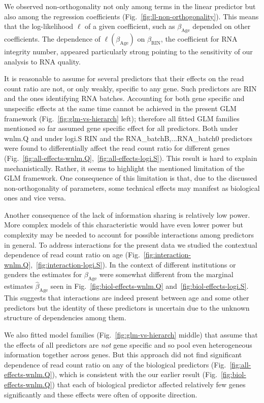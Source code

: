 \documentclass[letterpaper]{article}
\begin{document}
We observed non-orthogonality not only among terms in the linear predictor but
also among the regression coefficients (Fig.~\ref{fig:ll-non-orthogonality}).
This means that the log-likelihood \(\ell\) of a given coefficient, such as
\(\beta_\mathrm{Age}\) depended on other coefficients.  The dependence of
\(\ell(\beta_\mathrm{Age})\) on \(\beta_\mathrm{RIN}\), the coefficient for
RNA integrity number, appeared particularly strong pointing to the sensitivity
of our analysis to RNA quality.

It is reasonable to assume for several predictors that their effects on the
read count ratio are not, or only weakly, specific to any gene.  Such predictors are RIN
and the ones identifying RNA batches.  Accounting for both gene specific and
unspecific effects at the same time cannot be achieved in the present GLM
framework (Fig.~\ref{fig:glm-vs-hierarch} left); therefore all fitted GLM
families mentioned so far assumed gene specific effect for all predictors.
Both under wnlm.Q and under logi.S RIN and the RNA\_batchB,...RNA\_batch0
predictors were found to differentially affect the read count ratio for
different genes
(Fig.~\ref{fig:all-effects-wnlm.Q},~\ref{fig:all-effects-logi.S}).  This result
is hard to explain mechanistically.  Rather, it seems to highlight the
mentioned limitation of the GLM framework.  One consequence of this limitation
is that, due to the discussed non-orthogonality of parameters, some technical
effects may manifest as biological ones and vice versa.

Another consequence of the lack of information sharing is relatively low
power.  More complex models of this characteristic would have even lower power
but complexity may be needed to account for possible interactions among predictors in
general.  To address interactions for the present data we studied the contextual
dependence of read count ratio on age
(Fig.~\ref{fig:interaction-wnlm.Q},~\ref{fig:interaction-logi.S}).  In the
context of different institutions or genders the estimates for
\(\beta_\mathrm{Age}\) were somewhat different from the marginal estimates
\(\hat\beta_\mathrm{Age}\) seen in Fig.~\ref{fig:biol-effects-wnlm.Q}
and~\ref{fig:biol-effects-logi.S}.  This suggests that interactions are indeed
present between age and some other predictors but the identity of these
predictors is uncertain due to the unknown structure of dependencies among them.

We also fitted model families (Fig.~\ref{fig:glm-vs-hierarch} middle) that
assume that the effects of all predictors are \emph{not} gene specific and so
pool even heterogeneous information together across genes.  But this approach
did not find significant dependence of read count ratio on any of the
biological predictors (Fig.~\ref{fig:all-effects-wnlm.Q}), which is consistent
with the our earlier result (Fig.~\ref{fig:biol-effects-wnlm.Q}) that each of
biological predictor affected relatively few genes significantly and these
effects were often of opposite direction.
\end{document}
